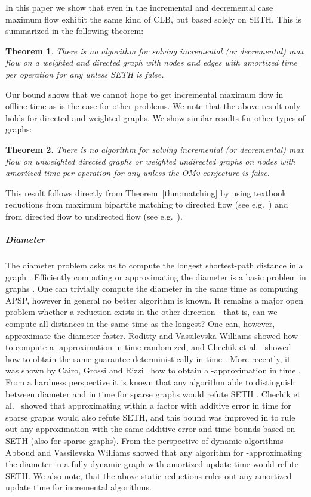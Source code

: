 \documentclass[a4paper,11pt]{article}
\newtheorem{theorem}{Theorem}
\theoremstyle{definition}
\begin{document}
In this paper we show that even in the incremental and decremental case 
maximum flow exhibit the same kind of CLB, but based solely on SETH. This is
summarized in the following theorem:
\begin{theorem}\label{thm:maxflow2}
    There is no algorithm for solving incremental (or decremental) max 
    flow on a weighted and directed graph with  nodes and  edges with
    amortized time  per operation for any  unless SETH
    is false.
\end{theorem}
Our bound shows that we cannot hope to get incremental maximum flow in offline
time as is the case for other problems.
We note that the above result only holds for directed
and weighted graphs. We show similar results for other types of graphs:
\begin{theorem}
    There is no algorithm for solving incremental (or decremental) max 
    flow on unweighted directed graphs or weighted undirected graphs on 
    nodes with amortized time  per operation for any 
    unless the OMv conjecture is false.
\end{theorem}
This result follows directly from Theorem~\ref{thm:matching} by using textbook
reductions from maximum bipartite matching to directed flow (see
e.g.~\cite{Cormen09book}) and from directed flow to undirected flow (see
e.g.~\cite{MadryThesis}).

\subparagraph*{Diameter}
The diameter problem asks us to compute the longest shortest-path distance in a
graph . Efficiently computing or approximating the diameter is a basic
problem in graphs
\cite{AbboudGV15,AingworthCIM99,ChechikLRSTW14,CyganGS15,RodittyW13}. One can
trivially compute the diameter in the same time as computing APSP, however in
general no
better algorithm is known. It remains a major open problem whether a reduction
exists in the other direction \cite{AbboudGV15} - that is, can we compute all
distances in the same time as the longest? One can, however, approximate the
diameter faster. Roditty and Vassilevska Williams \cite{RodittyW13} showed how
to compute a -approximation in time  randomized, and
Chechik et al.~\cite{ChechikLRSTW14} showed how to obtain the same guarantee
deterministically in time . More recently, it was
shown by Cairo, Grossi and Rizzi~\cite{CairoGR16} how to obtain a -approximation in time . From a
hardness perspective it is known that any algorithm able to distinguish between
diameter  and  in time  for sparse graphs would refute
SETH \cite{RodittyW13}. Chechik et al.~\cite{ChechikLRSTW14} showed that
approximating within a  factor with additive error  in time  for sparse graphs would also
refute SETH, and this bound was improved in \cite{CairoGR16} to rule out any
 approximation with the same additive error and time bounds based on
SETH (also for sparse graphs). From the perspective of dynamic algorithms
Abboud and Vassilevska Williams \cite{AbboudV14} showed that any algorithm for
-approximating the diameter in a fully dynamic graph with amortized
update time  would refute SETH. We also note, that the above
static reductions rules out any  amortized update time for
incremental algorithms.
\end{document}
